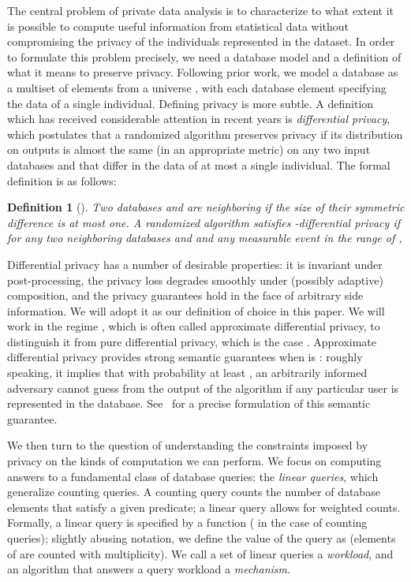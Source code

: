 \documentclass{article}
\newtheorem{definition}{Definition}[section]
\newcommand\junk[1]{}
\begin{document}
The central problem of private data analysis is to characterize to
what extent it is possible to compute useful information from
statistical data without compromising the privacy of the individuals
represented in the dataset. In order to formulate this problem
precisely, we need a database model and a definition of what it means
to preserve privacy. Following prior work, we model a database as a
multiset  of  elements from a universe \junk{, i.e.~}, with each database element specifying the data of a
single individual. Defining privacy is more subtle. A definition which
has received considerable attention in recent years is
\emph{differential privacy}, which postulates that a randomized
algorithm preserves privacy if its distribution on outputs is almost
the same (in an appropriate metric) on any two input databases  and
 that differ in the data of at most a single individual. The
formal definition is as follows:
\begin{definition}[\cite{DMNS}]\label{def:DP}
  Two databases  and  are \emph{neighboring} if the size of
  their symmetric difference is at most one. A randomized algorithm
   satisfies \emph{-differential privacy} if for any
  two neighboring databases  and  and any measurable event 
  in the range of ,
  
  \junk{Above, probabilities are taken over the internal coin tosses of .}
\end{definition}
Differential privacy has a number of desirable properties: it is
invariant under post-processing, the privacy loss degrades smoothly
under (possibly adaptive) composition, and the privacy guarantees hold
in the face of arbitrary side information. We will adopt it as our
definition of choice in this paper. We will work in the regime , which is often called approximate differential privacy, to
distinguish it from pure differential privacy, which is the case
. Approximate differential privacy provides strong semantic
guarantees when  is  : roughly speaking,
it implies that with probability at least , an
arbitrarily informed adversary cannot guess from the output of the
algorithm if any particular user is represented in the
database. See~\cite{GantaKS08} for a precise formulation of this
semantic guarantee.

We then turn to the question of understanding the constraints imposed
by privacy on the kinds of computation we can perform. We focus on
computing answers to a fundamental class of database queries: the
\emph{linear queries}, which generalize counting queries.  A counting
query counts the number of database elements that satisfy a given
predicate; a linear query allows for weighted
counts. Formally, a linear query is specified by a function
 ( in the case of
counting queries); slightly abusing notation, we define the value of
the query as  (elements of
 are counted with multiplicity). We call a set  of linear
queries a \emph{workload}, and an algorithm that answers a query
workload a \emph{mechanism}. 
\end{document}
